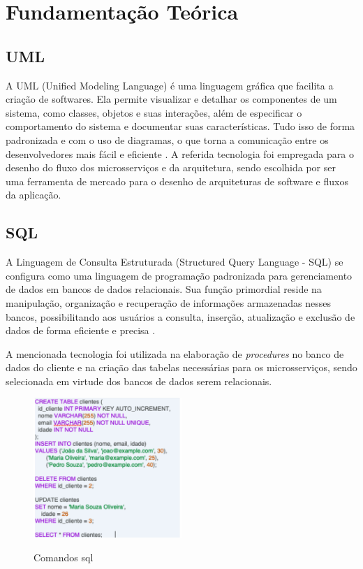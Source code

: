 \chapter{Fundamentação Teórica}
\label{cap:fundamentacao}

\section{UML}
A UML (Unified Modeling Language) é uma linguagem gráfica que facilita a criação de softwares. Ela permite visualizar e detalhar os componentes de um sistema, como classes, objetos e suas interações, além de especificar o comportamento do sistema e documentar suas características. Tudo isso de forma padronizada e com o uso de diagramas, o que torna a comunicação entre os desenvolvedores mais fácil e eficiente \cite{uml:explicacao}. 
A referida tecnologia foi empregada para o desenho do fluxo dos microsserviços e da arquitetura, sendo escolhida por ser uma ferramenta de mercado para o desenho de arquiteturas de software e fluxos da aplicação.


\section{SQL}
A Linguagem de Consulta Estruturada (Structured Query Language - SQL) se configura como uma linguagem de programação padronizada para gerenciamento de dados em bancos de dados relacionais. Sua função primordial reside na manipulação, 
organização e recuperação de informações armazenadas nesses bancos, possibilitando aos usuários a consulta, inserção, atualização e exclusão de dados de forma eficiente e precisa \cite{sql:explicacao}.

A mencionada tecnologia foi utilizada na elaboração de \textit{procedures} no banco de dados do cliente e na criação das tabelas necessárias para os microsserviços, sendo selecionada em virtude dos bancos de dados serem relacionais.
\begin{figure}
    \centering
    \caption{Comandos sql}
    \includegraphics[width=0.5\textwidth]{arquivos/imagens/sql.png}
    \label{sql-comandos}
\end{figure}

